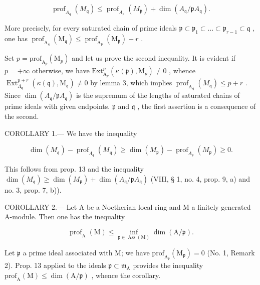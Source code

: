 \[
\operatorname{prof} _ {A _ {\mathfrak {q}}} (M _ {\mathfrak {q}}) \leqslant \operatorname{prof} _ {A _ {\mathfrak {p}}} (M _ {\mathfrak {p}}) + \dim (A _ {\mathfrak {q}} / \mathfrak {p} A _ {\mathfrak {q}}).
\]

More precisely, for every saturated chain of prime ideals \(\mathfrak{p} \subset \mathfrak{p}_1 \subset \ldots \subset \mathfrak{p}_{r-1} \subset \mathfrak{q}\) , one has \(\operatorname{prof}_{\mathrm{A}_{\mathfrak{q}}}(\mathrm{M}_{\mathfrak{q}}) \leqslant \operatorname{prof}_{\mathrm{A}_{\mathfrak{p}}}(\mathrm{M}_{\mathfrak{p}}) + r\) .

Set \(p = \text{prof}_{\text{A}_p}(\text{M}_p)\) and let us prove the second inequality. It is evident if \(p = +\infty\) otherwise, we have \(\text{Ext}_{\text{A}_p}^p(\kappa(\mathfrak{p}), \text{M}_p) \neq 0\) , whence \(\operatorname{Ext}_{\Lambda_{\mathfrak{q}}}^{p+r}(\kappa(\mathfrak{q}),\mathrm{M}_{\mathfrak{q}})\neq0\) by lemma 3, which implies \(\operatorname{prof}_{\mathrm{A}_{\mathfrak{q}}}(M_{\mathfrak{q}})\leqslant p+r\) . Since \(\dim(A_{\mathfrak{q}}/\mathfrak{p}A_{\mathfrak{q}})\) is the supremum of the lengths of saturated chains of prime ideals with given endpoints. \(\mathfrak{p}\) and \(\mathfrak{q}\) , the first assertion is a consequence of the second.

COROLLARY 1.--- We have the inequality

\[
\dim (M _ {\mathfrak {q}}) - \operatorname{prof} _ {\Lambda_ {\mathfrak {q}}} (M _ {\mathfrak {q}}) \geqslant \dim (M _ {\mathfrak {p}}) - \operatorname{prof} _ {A _ {\mathfrak {p}}} (M _ {\mathfrak {p}}) \geqslant 0.
\]

This follows from prop. 13 and the inequality \(\dim(M_{\mathfrak{q}}) \geqslant \dim(M_{\mathfrak{p}}) + \dim(A_{\mathfrak{q}} / \mathfrak{p}A_{\mathfrak{q}})\) (VIII, § 1, no. 4, prop. 9, a) and no. 3, prop. 7, b)).

COROLLARY 2.--- Let A be a Noetherian local ring and M a finitely generated A-module. Then one has the inequality

\[
\operatorname{prof} _ {\mathrm{A}} (\mathrm{M}) \leqslant \inf _ {\mathfrak {p} \in \operatorname{Ass} (\mathrm{M})} \dim (\mathrm{A} / \mathfrak {p}).
\]

Let \(\mathfrak{p}\) a prime ideal associated with M; we have \(\mathrm{prof}_{\mathrm{A}_{\mathfrak{p}}}(\mathrm{M}_{\mathfrak{p}})=0\) (No. 1, Remark 2). Prop. 13 applied to the ideals \(\mathfrak{p}\subset\mathfrak{m}_{\mathrm{A}}\) provides the inequality \(\mathrm{prof}_{\mathrm{A}}(\mathrm{M})\leqslant\dim(\mathrm{A}/\mathfrak{p})\) , whence the corollary.

